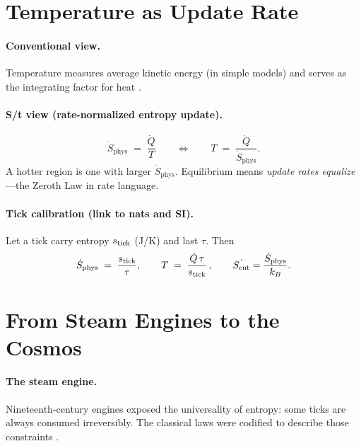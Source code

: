 \providecommand{\Sent}{S_{\mathrm{ent}}}             %
\newcommand{\Sphys}{S_{\mathrm{phys}}}               %
\newcommand{\dotSphys}{\dot{S}_{\mathrm{phys}}}      %

\section*{Temperature as Update Rate}

\paragraph{Conventional view.}
Temperature measures average kinetic energy (in simple models) and serves as the integrating factor for heat \cite{boltzmann1872,callen1985thermodynamics}.

\paragraph{S/t view (rate-normalized entropy update).}
\[
\dotSphys \;=\; \frac{\dot Q}{T}
\qquad\Longleftrightarrow\qquad
T \;=\; \frac{\dot Q}{\dotSphys}.
\]
A hotter region is one with larger \(\dotSphys\).
Equilibrium means \emph{update rates equalize}—the Zeroth Law in rate language.

\paragraph{Tick calibration (link to nats and SI).}
Let a tick carry entropy \(s_{\rm tick}\) (J/K) and last \(\tau\). Then
\[
\dotSphys \;=\; \frac{s_{\rm tick}}{\tau},
\qquad
T \;=\; \frac{\dot Q\,\tau}{s_{\rm tick}}\,,
\qquad
\dot{\Sent}=\frac{\dotSphys}{k_B}.
\]

\section*{From Steam Engines to the Cosmos}

\paragraph{The steam engine.}
Nineteenth-century engines exposed the universality of entropy: some ticks are always consumed irreversibly. The classical laws were codified to describe those constraints \cite{clausius1879mechanical,callen1985thermodynamics}.

